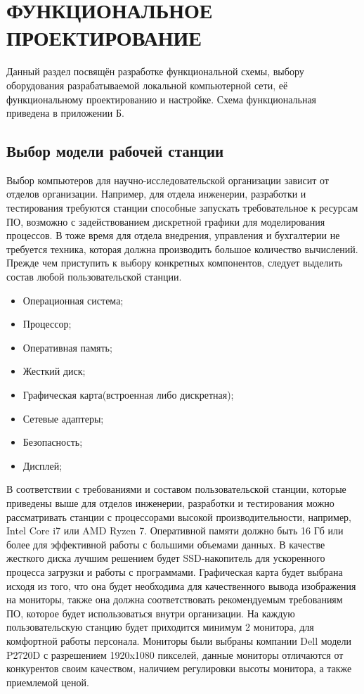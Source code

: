 \section{ФУНКЦИОНАЛЬНОЕ ПРОЕКТИРОВАНИЕ}
\label{sec:func}

Данный раздел посвящён разработке функциональной схемы, выбору оборудования 
разрабатываемой локальной компьютерной сети, её функциональному проектированию и настройке. 
Схема функциональная приведена в приложении Б. 

\subsection{Выбор модели рабочей станции}

Выбор компьютеров для научно-исследовательской организации зависит от отделов организации. 
Например, для отдела инженерии, разработки и тестирования требуются станции способные запускать требовательное к ресурсам ПО, 
возможно с задействованием дискретной графики для моделирования процессов. 
В тоже время для отдела внедрения, управления и бухгалтерии не требуется техника, которая должна производить большое количество вычислений.
Прежде чем приступить к выбору конкретных компонентов, следует выделить состав любой пользовательской станции.

\begin{itemize}
    \item Операционная система;
    \item Процессор;
    \item Оперативная память;
    \item Жесткий диск;
    \item Графическая карта(встроенная либо дискретная);
    \item Сетевые адаптеры;
    \item Безопасность;
    \item Дисплей;
\end{itemize}

В соответствии с требованиями и составом пользовательской станции, которые приведены выше для отделов инженерии, разработки и тестирования
можно рассматривать станции с процессорами высокой производительности, например, Intel Core i7 или AMD Ryzen 7. Оперативной памяти должно быть 16 Гб 
или более для эффективной работы с большими объемами данных. В качестве жесткого диска лучшим решением будет SSD-накопитель для ускоренного процесса 
загрузки и работы с программами. Графическая карта будет выбрана исходя из того, что она будет необходима для качественного вывода изображения на мониторы,
также она должна соответствовать рекомендуемым требованиям ПО, которое будет использоваться внутри организации. На каждую пользовательскую станцию будет приходится
минимум 2 монитора, для комфортной работы персонала. Мониторы были выбраны компании Dell модели P2720D с разрешением 1920x1080 пикселей, данные мониторы отличаются от конкурентов своим качеством,
наличием регулировки высоты монитора, а также приемлемой ценой.


